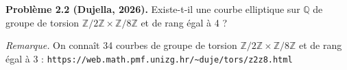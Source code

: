 \textbf{Problème 2.2 (Dujella, 2026).} Existe-t-il une courbe elliptique sur $\mathbb{Q}$ de groupe de torsion $\mathbb{Z}/2\mathbb{Z}\times\mathbb{Z}/8\mathbb{Z}$ et de rang égal à 4 ?

\medskip

\textit{Remarque.} On connaît 34 courbes de groupe de torsion $\mathbb{Z}/2\mathbb{Z}\times\mathbb{Z}/8\mathbb{Z}$ et de rang égal à 3 : \texttt{https://web.math.pmf.unizg.hr/\textasciitilde duje/tors/z2z8.html}
